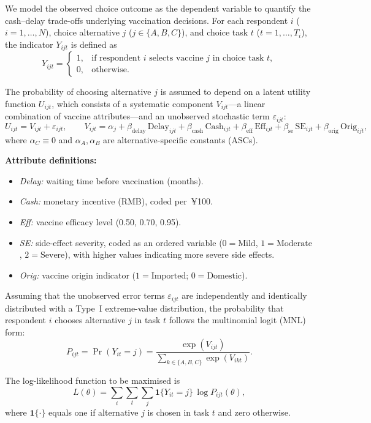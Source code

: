\documentclass[12pt]{article}
\begin{document}
We model the observed choice outcome as the dependent variable to quantify the cash--delay
trade-offs underlying vaccination decisions. For each respondent $i$ ($i = 1,\ldots,N$),
choice alternative $j$ ($j \in \{A,B,C\}$), and choice task $t$ ($t = 1,\ldots,T_i$), the
indicator $Y_{ijt}$ is defined as
\[
Y_{ijt} =
\begin{cases}
1, & \text{if respondent $i$ selects vaccine $j$ in choice task $t$},\\[4pt]
0, & \text{otherwise.}
\end{cases}
\]

The probability of choosing alternative $j$ is assumed to depend on a latent utility
function $U_{ijt}$, which consists of a systematic component $V_{ijt}$---a linear
combination of vaccine attributes---and an unobserved stochastic term $\varepsilon_{ijt}$:
\[
U_{ijt} = V_{ijt} + \varepsilon_{ijt}, \qquad
V_{ijt} = \alpha_j
+ \beta_{\text{delay}} \,\text{Delay}_{ijt}
+ \beta_{\text{cash}}  \,\text{Cash}_{ijt}
+ \beta_{\text{eff}}   \,\text{Eff}_{ijt}
+ \beta_{\text{se}}    \,\text{SE}_{ijt}
+ \beta_{\text{orig}}  \,\text{Orig}_{ijt},
\]
where $\alpha_C \equiv 0$ and $\alpha_A, \alpha_B$ are alternative-specific constants (ASCs).

\noindent \textbf{Attribute definitions:}
\begin{itemize}[leftmargin=1.5em]
  \item \textit{Delay:} waiting time before vaccination (months).
  \item \textit{Cash:} monetary incentive (RMB), coded per~¥100.
  \item \textit{Eff:} vaccine efficacy level (0.50, 0.70, 0.95).
  \item \textit{SE:} side-effect severity, coded as an ordered variable
        ($0 = \text{Mild}$, $1 = \text{Moderate}$, $2 = \text{Severe}$), with higher values
        indicating more severe side effects.
  \item \textit{Orig:} vaccine origin indicator ($1 = \text{Imported}$; $0 = \text{Domestic}$).
\end{itemize}

Assuming that the unobserved error terms $\varepsilon_{ijt}$ are independently and
identically distributed with a Type~I extreme-value distribution, the probability that
respondent $i$ chooses alternative $j$ in task $t$ follows the multinomial logit (MNL) form:
\[
P_{ijt} = \Pr(Y_{it} = j)
= \frac{\exp(V_{ijt})}{\sum_{k \in \{A,B,C\}} \exp(V_{ikt})}.
\]

The log-likelihood function to be maximised is
\[
L(\theta)
= \sum_i \sum_t \sum_j \mathbf{1}\{Y_{it}=j\} \, \log P_{ijt}(\theta),
\]
where $\mathbf{1}\{\cdot\}$ equals one if alternative $j$ is chosen in task $t$ and zero otherwise.
\end{document}
